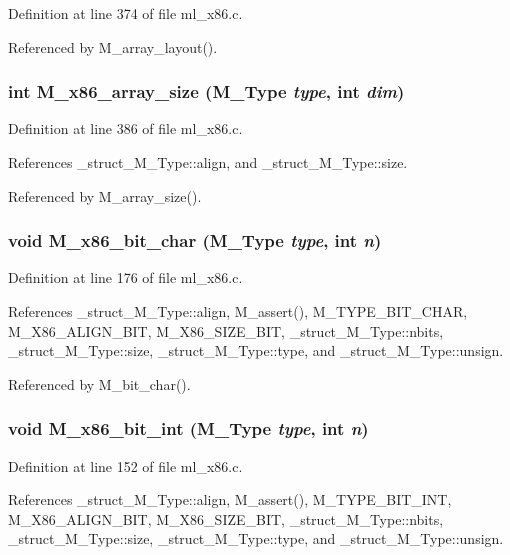 Definition at line 374 of file ml\_\-x86.c.

Referenced by M\_\-array\_\-layout().
\subsubsection{\setlength{\rightskip}{0pt plus 5cm}int M\_\-x86\_\-array\_\-size (\bf{M\_\-Type} {\em type}, int {\em dim})}\label{m__x86_8h_0ea09e63dca52af5779b9fdf0c0dd552}




Definition at line 386 of file ml\_\-x86.c.

References \_\-struct\_\-M\_\-Type::align, and \_\-struct\_\-M\_\-Type::size.

Referenced by M\_\-array\_\-size().
\subsubsection{\setlength{\rightskip}{0pt plus 5cm}void M\_\-x86\_\-bit\_\-char (\bf{M\_\-Type} {\em type}, int {\em n})}\label{m__x86_8h_d01a3813dde73a5257b799e26f65066a}




Definition at line 176 of file ml\_\-x86.c.

References \_\-struct\_\-M\_\-Type::align, M\_\-assert(), M\_\-TYPE\_\-BIT\_\-CHAR, M\_\-X86\_\-ALIGN\_\-BIT, M\_\-X86\_\-SIZE\_\-BIT, \_\-struct\_\-M\_\-Type::nbits, \_\-struct\_\-M\_\-Type::size, \_\-struct\_\-M\_\-Type::type, and \_\-struct\_\-M\_\-Type::unsign.

Referenced by M\_\-bit\_\-char().
\subsubsection{\setlength{\rightskip}{0pt plus 5cm}void M\_\-x86\_\-bit\_\-int (\bf{M\_\-Type} {\em type}, int {\em n})}\label{m__x86_8h_bf35d69768d22693fa9279fa7bde3f0b}




Definition at line 152 of file ml\_\-x86.c.

References \_\-struct\_\-M\_\-Type::align, M\_\-assert(), M\_\-TYPE\_\-BIT\_\-INT, M\_\-X86\_\-ALIGN\_\-BIT, M\_\-X86\_\-SIZE\_\-BIT, \_\-struct\_\-M\_\-Type::nbits, \_\-struct\_\-M\_\-Type::size, \_\-struct\_\-M\_\-Type::type, and \_\-struct\_\-M\_\-Type::unsign.

